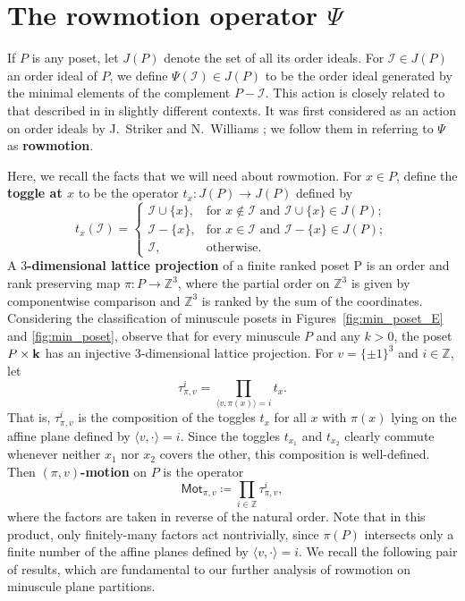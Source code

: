 \documentclass[12pt]{amsart}
\theoremstyle{definition}
\theoremstyle{remark}
\numberwithin{equation}{section}
\newcommand{\mot}{\ensuremath{\mathsf{Mot}}}
\newcommand{\uu}{\mathcal{I}}
\begin{document}
\section{The rowmotion operator $\Psi$}\label{sec:rowmotion}

If $P$ is any poset, let $J(P)$ denote the set of all its order ideals. For $\uu \in J(P)$ an order ideal of $P$, we define $\Psi(\uu) \in J(P)$ to be the order ideal generated by the minimal elements of the complement $P - \uu$. This action is closely related to that described in \cite{Brouwer.Schrijver,Duchet,Cameron.Fonderflaass} in slightly different contexts. It was first considered as an action on order ideals by J.~Striker and N.~Williams \cite{Striker.Williams}; we follow them in referring to $\Psi$ as {\bf rowmotion}.

Here, we recall the facts that we will need about rowmotion. For $x \in P$, define the {\bf toggle at $x$} to be the operator $t_x : J(P) \to J(P)$ defined by
\[
t_x(\uu) = \left\{ \begin{array}{ll}
        \uu \cup \{x\}, & \text{for } x \notin \uu \text{ and } \uu \cup \{x\} \in J(P); \\
        \uu - \{x\}, & \text{for } x \in \uu \text{ and } \uu - \{x\} \in J(P);\\
        \uu, & \text{otherwise. }
        \end{array} \right.
\]
A {\bf $3$-dimensional lattice projection} of a finite ranked poset P is an order and rank preserving map $\pi : P \to \mathbb{Z}^3$, where the partial order on $\mathbb{Z}^3$ is given by componentwise comparison and $\mathbb{Z}^3$ is ranked by the sum of the coordinates. Considering the classification of minuscule posets in Figures~\ref{fig:min_poset_E} and \ref{fig:min_poset}, observe that for every minuscule $P$ and any $k > 0$, the poset $P \times {\bf k}$ has an injective $3$-dimensional lattice projection. For $v = \{\pm 1 \}^3$ and $i \in \mathbb{Z}$, let 
\[
\tau_{\pi,v}^i = \prod_{\langle v, \pi(x) \rangle = i} t_x.
\]
That is, $\tau_{\pi,v}^i$ is the composition of the toggles $t_x$ for all $x$ with $\pi(x)$ lying on the affine plane defined by $\langle v, \cdot \rangle = i$. Since the toggles $t_{x_1}$ and $t_{x_2}$ clearly commute whenever neither $x_1$ nor $x_2$ covers the other, this composition is well-defined. Then {\bf  $(\pi, v)$-motion} on $P$ is the operator
\[
\mot_{\pi, v} \coloneqq \prod_{i \in \mathbb{Z}} \tau_{\pi,v}^i,
\]
where the factors are taken in reverse of the natural order. Note that in this product, only finitely-many factors act nontrivially, since $\pi(P)$ intersects only a finite number of the affine planes defined by $\langle v, \cdot \rangle = i$. We recall the following pair of results, which are fundamental to our further analysis of rowmotion on minuscule plane partitions.
\end{document}
